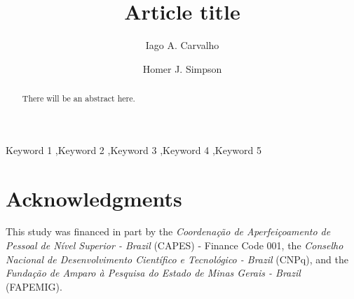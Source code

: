\documentclass[preprint,review,12pt]{elsarticle}
\begin{document}
\begin{frontmatter}


\title{Article title}


\author[unifal]{Iago A. Carvalho}

\author[label2]{Homer J. Simpson}

\address[unifal]{Department of Computer Science, Universidade Federal de Alfenas}


\address[label2]{Twenty Century Fox, USA}

\begin{abstract}
There will be an abstract here.
\end{abstract}

\begin{keyword}
Keyword 1 \sep Keyword 2 \sep Keyword 3 \sep Keyword 4 \sep Keyword 5
\end{keyword}

\end{frontmatter}





\section*{Acknowledgments}
This study was financed in part by the \emph{Coordenação de Aperfeiçoamento de Pessoal de Nível Superior - Brazil} (CAPES) - Finance Code 001, the \emph{Conselho Nacional de Desenvolvimento Científico e Tecnológico - Brazil} (CNPq), and the \emph{Fundação de Amparo à Pesquisa do Estado de Minas Gerais - Brazil} (FAPEMIG).


% 
% 
% 
% 
% 
% 
% 
% 
% 
% 
% 
% 


\end{document}
